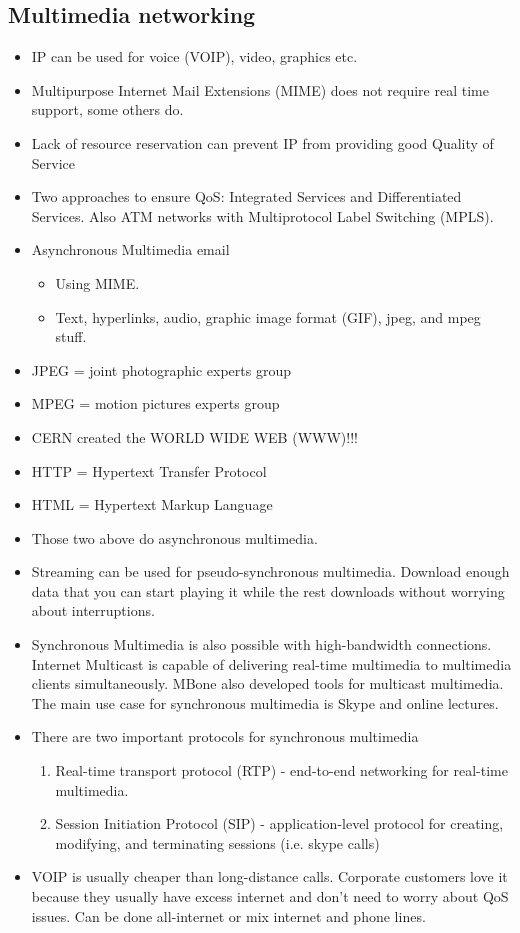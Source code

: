 \documentclass{scrartcl}
\begin{document}
\subsection*{Multimedia networking}
\begin{itemize}
\item IP can be used for voice (VOIP), video, graphics etc.
\item Multipurpose Internet Mail Extensions (MIME) does not require real time
support, some others do.
\item Lack of resource reservation can prevent IP from providing good
Quality of Service
\item Two approaches to ensure QoS: Integrated Services and Differentiated
Services. Also ATM networks with Multiprotocol Label Switching (MPLS).
\item Asynchronous Multimedia email
\begin{itemize}
\item Using MIME.
\item Text, hyperlinks, audio, graphic image format (GIF), jpeg, and mpeg
stuff.\end{itemize}
\item JPEG = joint photographic experts group
\item MPEG = motion pictures experts group
\item CERN created the WORLD WIDE WEB (WWW)!!!
\item HTTP = Hypertext Transfer Protocol
\item HTML = Hypertext Markup Language
\item Those two above do asynchronous multimedia.
\item Streaming can be used for pseudo-synchronous multimedia. Download
enough data that you can start playing it while the rest downloads without
worrying about interruptions.
\item Synchronous Multimedia is also possible with high-bandwidth connections. 
Internet Multicast is capable of delivering real-time multimedia to multimedia
clients simultaneously. MBone also developed tools for multicast multimedia.
The main use case for synchronous multimedia is Skype and online lectures.
\item There are two important protocols for synchronous multimedia
\begin{enumerate}
\item Real-time transport protocol (RTP) - end-to-end networking for
real-time multimedia.
\item Session Initiation Protocol (SIP) - application-level protocol for
creating, modifying, and terminating sessions (i.e. skype calls)
\end{enumerate}
\item VOIP is usually cheaper than long-distance calls. Corporate customers
love it because they usually have excess internet and don't need to worry
about QoS issues. Can be done all-internet or mix internet and phone lines.
\end{itemize}
\end{document}

